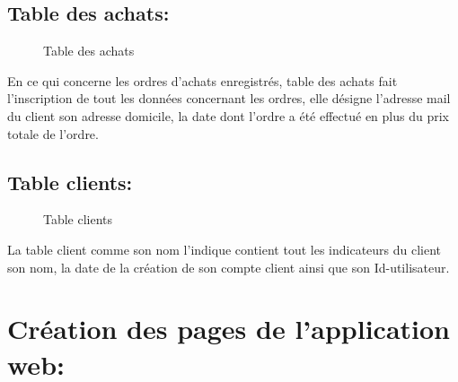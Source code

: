 \documentclass[a4paper]{report}
\begin{document}
\begin{doublespace}
\begin{doublespace}
\begin{doublespace}
\begin{doublespace}
\begin{doublespace}
                    \subsection{ Table des achats: }
                    \begin{figure}[H]

                        \caption{Table des achats}
                    \end{figure}
                    En ce qui concerne les ordres d'achats enregistrés,
                    table  des achats fait l'inscription de tout les données concernant les ordres,
                    elle désigne l'adresse mail du client son adresse domicile, la	date dont
                    l'ordre a été effectué en plus du prix totale de l'ordre.
                    \subsection{ Table clients: }
                    \begin{figure}[H]

                        \caption{Table clients}
                    \end{figure}
                    La table client comme son nom l'indique contient tout
                    les indicateurs du client son nom, la date de la création de son compte client
                    ainsi que son Id-utilisateur.

                    \section{Création des pages de l'application web:}

\end{doublespace}
\end{doublespace}
\end{doublespace}
\end{doublespace}
\end{doublespace}
\end{document}
